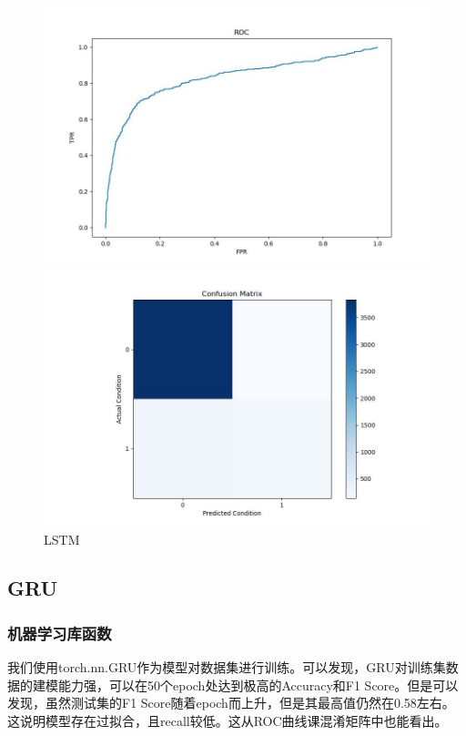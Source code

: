 \documentclass[UTF8]{article}
\begin{document}
\begin{figure}[h]
    \begin{minipage}{.48\linewidth}
        \centering
        \includegraphics[width=\linewidth]{../figure/LSTM_ROC.jpg}
    \end{minipage}
    \begin{minipage}{.48    \linewidth}
        \centering
        \includegraphics[width=\linewidth]{../figure/LSTM_Confusion.jpg}
    \end{minipage}
    \caption{LSTM}
\end{figure}

\subsection{GRU}
\subsubsection{机器学习库函数}
我们使用torch.nn.GRU作为模型对数据集进行训练。可以发现，GRU对训练集数据的建模能力强，可以在50个epoch处达到极高的Accuracy和F1 Score。但是可以发现，虽然测试集的F1 Score随着epoch而上升，但是其最高值仍然在0.58左右。这说明模型存在过拟合，且recall较低。这从ROC曲线课混淆矩阵中也能看出。
\end{document}
